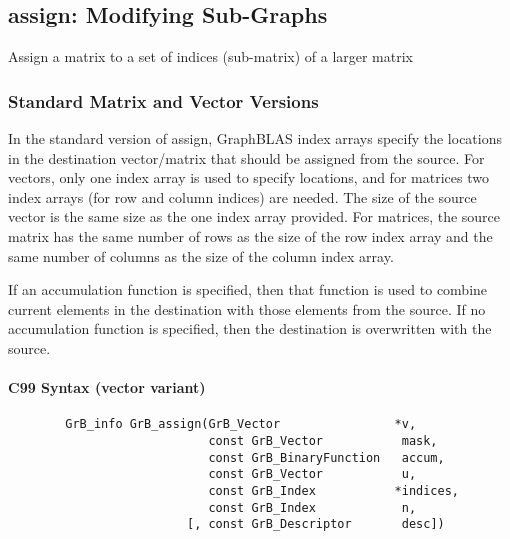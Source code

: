 \subsection{{\sf assign}: Modifying Sub-Graphs}

Assign a matrix to a set of indices (sub-matrix) of a larger matrix


\subsubsection{Standard Matrix and Vector Versions}

In the standard version of {\sf assign}, GraphBLAS index arrays specify
the locations in the destination vector/matrix that should be assigned
from the source.  For vectors, only one index array is used to specify
locations, and for matrices two index arrays (for row and column indices)
are needed.  The size of the source vector is the same size as the one
index array provided.  For matrices, the source matrix has the same
number of rows as the size of the row index array and the same number
of columns as the size of the column index array.

If an accumulation function is specified, then that function is used
to combine current elements in the destination with those elements
from the source.  If no accumulation function is specified, then the
destination is overwritten with the source.


\paragraph{C99 Syntax (vector variant)}

\begin{verbatim}
        GrB_info GrB_assign(GrB_Vector                *v,
                            const GrB_Vector           mask,
                            const GrB_BinaryFunction   accum,
                            const GrB_Vector           u,
                            const GrB_Index           *indices,
                            const GrB_Index            n,
                         [, const GrB_Descriptor       desc])
\end{verbatim}

